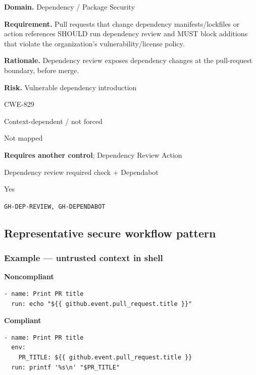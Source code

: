 \documentclass[10pt,letterpaper]{article}
\newcommand{\prioritybadge}[2]{\tcbox[on line,boxrule=0pt,arc=1.2mm,boxsep=0.7mm,left=1mm,right=1mm,top=0.4mm,bottom=0.4mm,colback=#2!12,coltext=#2]{\scriptsize\bfseries #1}}
\begin{document}
\begin{rulebox}[title={\texttt{SCS-ACTIONS-DEP-002} \hfill \prioritybadge{High Priority}{High}}]
\textbf{Domain.} Dependency / Package Security

\textbf{Requirement.} Pull requests that change dependency manifests/lockfiles or action references SHOULD run dependency review and MUST block additions that violate the organization's vulnerability/license policy.

\textbf{Rationale.} Dependency review exposes dependency changes at the pull-request boundary, before merge.

\textbf{Risk.} Vulnerable dependency introduction

\begin{description}[leftmargin=2.65cm,labelwidth=2.3cm,style=nextline,itemsep=1pt,topsep=3pt]
  \item[CWE] CWE-829
  \item[OWASP] Context-dependent / not forced
  \item[CERT] Not mapped
  \item[CodeQL] \textbf{Requires another control}; Dependency Review Action
  \item[Enforcement] Dependency review required check + Dependabot
  \item[Automation] Yes
  \item[Sources] \texttt{GH-DEP-REVIEW, GH-DEPENDABOT}
\end{description}
\end{rulebox}
\subsection*{Representative secure workflow pattern}
\subsubsection*{Example --- untrusted context in shell}

\textbf{Noncompliant}\par
\begin{lstlisting}
- name: Print PR title
  run: echo "${{ github.event.pull_request.title }}"
\end{lstlisting}

\textbf{Compliant}\par
\begin{lstlisting}
- name: Print PR title
  env:
    PR_TITLE: ${{ github.event.pull_request.title }}
  run: printf '%s\n' "$PR_TITLE"
\end{lstlisting}
\end{document}
